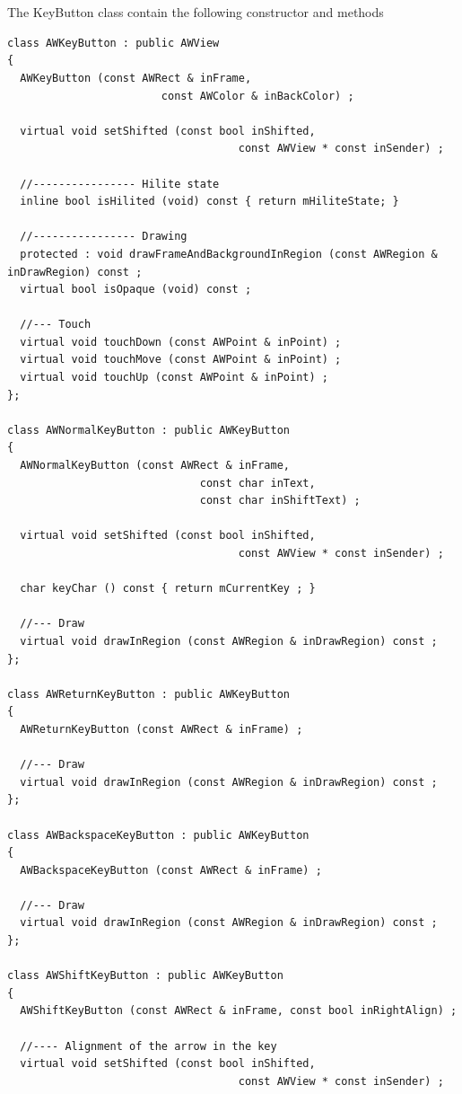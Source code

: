 \documentclass[a4paper,11pt]{extarticle}
\begin{document}
~\\

~\\ The KeyButton class contain the following constructor and methods

\begin{lstlisting}[language=Arduinonl]
class AWKeyButton : public AWView
{
  AWKeyButton (const AWRect & inFrame,
                        const AWColor & inBackColor) ;
  
  virtual void setShifted (const bool inShifted,
                                    const AWView * const inSender) ;

  //---------------- Hilite state
  inline bool isHilited (void) const { return mHiliteState; }
  
  //---------------- Drawing
  protected : void drawFrameAndBackgroundInRegion (const AWRegion & inDrawRegion) const ;
  virtual bool isOpaque (void) const ;

  //--- Touch
  virtual void touchDown (const AWPoint & inPoint) ;
  virtual void touchMove (const AWPoint & inPoint) ;
  virtual void touchUp (const AWPoint & inPoint) ;
};

class AWNormalKeyButton : public AWKeyButton
{
  AWNormalKeyButton (const AWRect & inFrame,
                              const char inText,
                              const char inShiftText) ;
  
  virtual void setShifted (const bool inShifted,
                                    const AWView * const inSender) ;
  
  char keyChar () const { return mCurrentKey ; }
  
  //--- Draw
  virtual void drawInRegion (const AWRegion & inDrawRegion) const ;
};

class AWReturnKeyButton : public AWKeyButton
{
  AWReturnKeyButton (const AWRect & inFrame) ;
  
  //--- Draw
  virtual void drawInRegion (const AWRegion & inDrawRegion) const ;
};

class AWBackspaceKeyButton : public AWKeyButton
{
  AWBackspaceKeyButton (const AWRect & inFrame) ;
  
  //--- Draw
  virtual void drawInRegion (const AWRegion & inDrawRegion) const ;
};

class AWShiftKeyButton : public AWKeyButton
{
  AWShiftKeyButton (const AWRect & inFrame, const bool inRightAlign) ;
  
  //---- Alignment of the arrow in the key
  virtual void setShifted (const bool inShifted,
                                    const AWView * const inSender) ;
  

\end{lstlisting}
\end{document}
